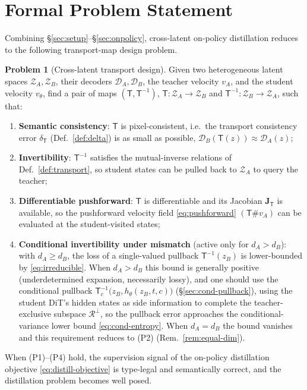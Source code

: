 \documentclass[11pt,a4paper]{article}
\newcommand{\Za}{\mathcal{Z}_{A}}
\newcommand{\Zb}{\mathcal{Z}_{B}}
\newcommand{\Dec}{\mathcal{D}}
\newcommand{\Tmap}{\mathsf{T}}
\newcommand{\Tinv}{\mathsf{T}^{-1}}
\newcommand{\push}{\#}
\newcommand{\Jac}{\mathbf{J}}
\theoremstyle{definition}
\newtheorem{problem}{Problem}
\begin{document}
\section{Formal Problem Statement}
\label{sec:problem-statement}

Combining \S\ref{sec:setup}--\S\ref{sec:onpolicy}, cross-latent on-policy distillation reduces to
the following transport-map design problem.

\begin{problem}[Cross-latent transport design]
\label{prob:main}
Given two heterogeneous latent spaces $\Za,\Zb$, their decoders $\Dec_A,\Dec_B$, the teacher
velocity $v_A$, and the student velocity $v_\theta$, find a pair of maps $(\Tmap,\Tinv)$,
$\Tmap:\Za\to\Zb$ and $\Tinv:\Zb\to\Za$, such that:
\begin{enumerate}[leftmargin=2.4em,label=\textup{(P\arabic*)},itemsep=3pt]
  \item \textbf{Semantic consistency}: $\Tmap$ is pixel-consistent, i.e.\ the transport
        consistency error $\delta_{\Tmap}$ (Def.~\ref{def:delta}) is as small as possible,
        $\Dec_B(\Tmap(z))\approx\Dec_A(z)$;
  \item \textbf{Invertibility}: $\Tinv$ satisfies the mutual-inverse relations of
        Def.~\ref{def:transport}, so student states can be pulled back to $\Za$ to query the
        teacher;
  \item \textbf{Differentiable pushforward}: $\Tmap$ is differentiable and its Jacobian
        $\Jac_{\Tmap}$ is available, so the pushforward velocity field
        \eqref{eq:pushforward} $(\Tmap\push v_A)$ can be evaluated at the student-visited states;
  \item \textbf{Conditional invertibility under mismatch} (active only for $d_A>d_B$): with
        $d_A\ge d_B$, the loss of a single-valued pullback $\Tinv(z_B)$ is lower-bounded by
        \eqref{eq:irreducible}. When $d_A>d_B$ this bound is generally positive (underdetermined
        expansion, necessarily lossy), and one should use the conditional pullback
        $\Tinv_{c}\big(z_B,h_\theta(z_B,t,c)\big)$ (\S\ref{sec:cond-pullback}), using the student
        DiT's hidden states as side information to complete the teacher-exclusive subspace
        $\mathcal{R}^{\perp}$, so the pullback error approaches the conditional-variance lower
        bound \eqref{eq:cond-entropy}. When $d_A=d_B$ the bound vanishes and this requirement
        reduces to (P2) (Rem.~\ref{rem:equal-dim}).
\end{enumerate}
When (P1)--(P4) hold, the supervision signal of the on-policy distillation objective
\eqref{eq:distill-objective} is type-legal and semantically correct, and the distillation problem
becomes well posed.
\end{problem}
\end{document}
